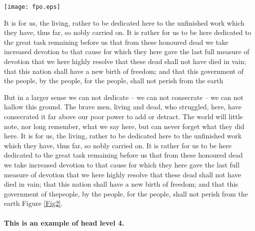 \documentclass{pasa}%
\begin{document}
\begin{figure*}
\begin{center}
\texttt{[image: fpo.eps]}
\caption{It is rather for us to be here dedicated to the great task remaining before us  that from these honoured dead we take increased devotion to that cause for which $x^{(0)}=x_1$ and $x^{(0)}=x_2$, where $x_1=(\frac{1}{\sqrt{3,522}},\dots,\frac{1}{\sqrt{3,522}})^T$ and $x_2=(\frac{1}{\sqrt{1,000}}, \dots, \frac{1}{\sqrt{1,000}},0,\dots,0)^T $. they here gave the last full measure of devotion  that we here highly resolve that these dead shall not have died in vain; that this nation shall have a new birth of freedom; and that this government of the people, by the people, for the people, shall not perish from the earth $(x^{(0)})^Tx^{(0)}=1$.}
 \label{Fig2}
\end{center}
\end{figure*}

It is for us, the living, rather to be dedicated here to the unfinished work which they have, thus far, so nobly carried on. It is rather for us to be here dedicated to the great task remaining before us  that from these honoured dead we take increased devotion to that cause for which they here gave the last full measure of devotion  that we here highly resolve that these dead shall not have died in vain; that this nation shall have a new birth of freedom; and that this government of the people, by the people, for the people, shall not perish from the earth

But in a larger sense we can not dedicate -- we can not consecrate -- we can not hallow this ground. The brave men, living and dead, who struggled, here, have consecrated it far above our poor power to add or detract. The world will little note, nor long remember, what we say here, but can never forget what they did here. It is for us, the living, rather to be dedicated here to the unfinished work which they have, thus far, so nobly carried on. It is rather for us to be here dedicated to the great task remaining before us  that from these honoured dead we take increased devotion to that cause for which they here gave the last full measure of devotion  that we here highly resolve that these dead shall not have died in vain; that this nation shall have a new birth of freedom; and that this government of the\break people, by the people, for the people, shall not perish from the earth Figure \ref{Fig2}.


\paragraph{This is an example of head level 4.}
\end{document}
